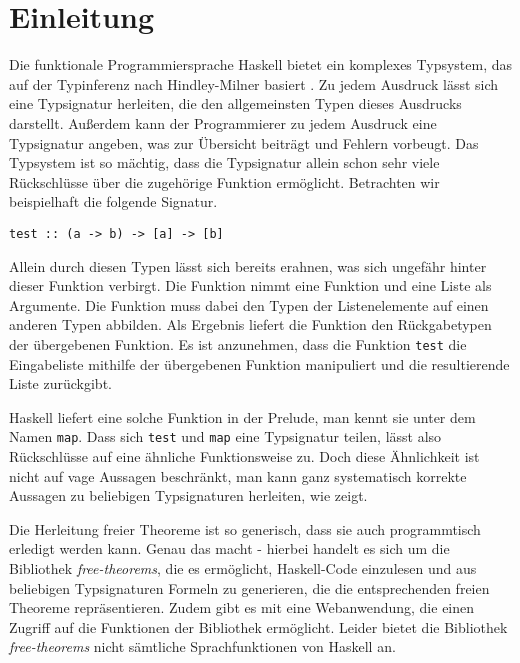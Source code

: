 \section{Einleitung}

Die funktionale Programmiersprache Haskell bietet ein komplexes Typsystem, das auf der Typinferenz nach Hindley-Milner basiert .
Zu jedem Ausdruck lässt sich eine Typsignatur herleiten, die den allgemeinsten Typen dieses Ausdrucks darstellt. Außerdem
kann der Programmierer zu jedem Ausdruck eine Typsignatur angeben, was zur Übersicht beiträgt und Fehlern vorbeugt.
Das Typsystem ist so mächtig, dass die Typsignatur allein schon sehr viele Rückschlüsse über die zugehörige Funktion ermöglicht.
Betrachten wir beispielhaft die folgende Signatur.

\begin{verbatim}
test :: (a -> b) -> [a] -> [b]
\end{verbatim}

Allein durch diesen Typen lässt sich bereits erahnen, was sich ungefähr hinter dieser Funktion verbirgt. Die Funktion nimmt
eine Funktion und eine Liste als Argumente. Die Funktion muss dabei den Typen der Listenelemente auf einen anderen Typen
abbilden. Als Ergebnis liefert die Funktion den Rückgabetypen der übergebenen Funktion. Es ist anzunehmen, dass die Funktion
\texttt{test} die Eingabeliste mithilfe der übergebenen Funktion manipuliert und die resultierende Liste zurückgibt.

Haskell liefert eine solche Funktion in der Prelude, man kennt sie unter dem Namen \texttt{map}. Dass sich \texttt{test} und
\texttt{map} eine Typsignatur teilen, lässt also Rückschlüsse auf eine ähnliche Funktionsweise zu. Doch diese Ähnlichkeit
ist nicht auf vage Aussagen beschränkt, man kann ganz systematisch korrekte Aussagen zu beliebigen Typsignaturen
herleiten, wie \cite{xyz}  zeigt.

Die Herleitung freier Theoreme ist so generisch, dass sie auch programmtisch erledigt werden kann. Genau das macht
\cite{bla}  - hierbei handelt es sich um die Bibliothek \textit{free-theorems}, die es ermöglicht, Haskell-Code einzulesen
und aus beliebigen Typsignaturen Formeln zu generieren, die die entsprechenden freien Theoreme repräsentieren. Zudem gibt es
mit \cite{x}  eine Webanwendung, die einen Zugriff auf die Funktionen der Bibliothek ermöglicht.
Leider bietet die Bibliothek \textit{free-theorems} nicht sämtliche Sprachfunktionen von Haskell an. 

